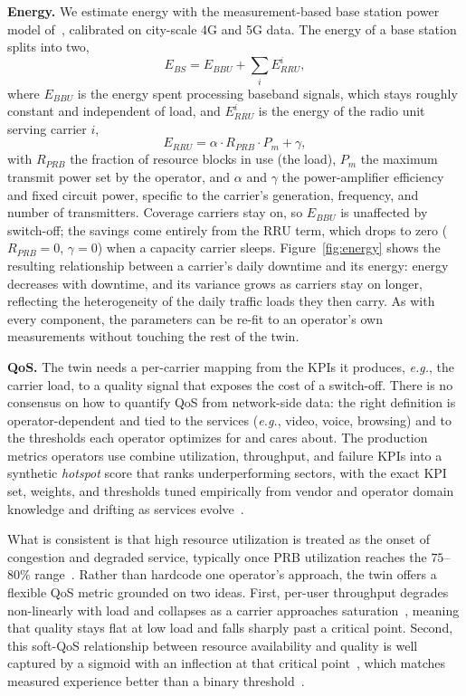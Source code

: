 \documentclass[sigconf, 10pt]{acmart}
\newcommand{\eg}{\textit{e.g.},\xspace}
\begin{document}
\noindent\textbf{Energy.} 
We estimate energy with the measurement-based base station
power model of~\cite{energy_consumption_formula}, calibrated on city-scale 4G and 5G
data. 
The energy of a base station splits into two,
\begin{equation}
  E_{BS} = E_{BBU} + \sum_{i} E^{i}_{RRU},
  \label{eq:e_bs}
\end{equation}
where $E_{BBU}$ is the energy spent processing baseband signals, which stays roughly constant and independent of load, and $E^{i}_{RRU}$ is the energy of the radio unit serving carrier $i$,
\begin{equation}
  E_{RRU} = \alpha \cdot R_{PRB} \cdot P_{m} + \gamma,
  \label{eq:e_rru}
\end{equation}
with $R_{PRB}$ the fraction of resource blocks in use (the load), $P_{m}$ the maximum transmit power set by the operator, and $\alpha$ and $\gamma$ the power-amplifier efficiency and fixed circuit power, specific to the carrier's generation, frequency, and number of transmitters. 
Coverage carriers stay on, so $E_{BBU}$ is unaffected by switch-off; the savings come entirely from the RRU term, which drops to zero ($R_{PRB}=0$, $\gamma=0$) when a capacity carrier sleeps. 
Figure~\ref{fig:energy} shows the resulting relationship between a carrier's daily downtime and its energy: energy decreases with downtime, and its variance grows as carriers stay on longer, reflecting the heterogeneity of the daily traffic loads they then carry. 
As with every component, the parameters can be re-fit to an operator's own measurements without touching the rest of the twin.

\noindent\textbf{QoS.} 
The twin needs a per-carrier mapping from the \acp{KPI} it produces, \eg the carrier load, to a quality signal that exposes the cost of a switch-off.
There is no consensus on how to quantify \ac{QoS} from network-side data: the right definition is operator-dependent and tied to the services (\eg video, voice, browsing) and to the thresholds each operator optimizes for and cares about.
The production metrics operators use combine utilization, throughput, and failure \acp{KPI} into a synthetic \textit{hotspot} score that ranks underperforming sectors, with the exact \ac{KPI} set, weights, and thresholds tuned empirically from vendor and operator domain knowledge and drifting as services evolve~\cite{the_good_bad_kpi}.

What is consistent is that high resource utilization is treated as the onset of congestion and degraded service, typically once \ac{PRB} utilization reaches the $75$--$80\%$ range~\cite{the_good_bad_kpi, infocom_telf}.
Rather than hardcode one operator's approach, the twin offers a flexible \ac{QoS} metric grounded on two ideas.
First, per-user throughput degrades non-linearly with load and collapses as a carrier approaches saturation~\cite{bonald2003wireless, roberts2004survey}, meaning that quality stays flat at low load and falls sharply past a critical point.
Second, this soft-\ac{QoS} relationship between resource availability and quality is well captured by a sigmoid with an inflection at that critical point~\cite{lee2014qoe}, which matches measured experience better than a binary threshold~\cite{the_good_bad_kpi}.
\end{document}
